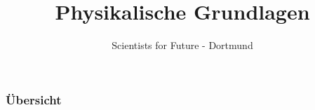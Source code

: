 

\author{Scientists for Future - Dortmund}
\title{Physikalische Grundlagen}



	\begin{frame}[plain]
		\maketitle
	\end{frame}

	\begin{frame}
		\frametitle{Übersicht}
		\tableofcontents
	\end{frame}

	
	
	


